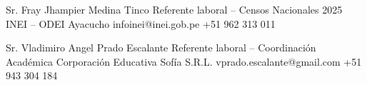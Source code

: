 \begin{referees}
	{Sr. Fray Jhampier Medina Tinco}
	{Referente laboral -- Censos Nacionales 2025}
	{INEI -- ODEI Ayacucho}
	{infoinei@inei.gob.pe}
	{+51 962 313 011}

	{Sr. Vladimiro Angel Prado Escalante}
	{Referente laboral -- Coordinación Académica}
	{Corporación Educativa Sofía S.R.L.}
	{vprado.escalante@gmail.com}
	{+51 943 304 184}

	
\end{referees}
